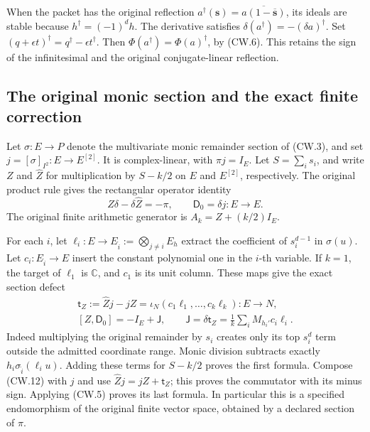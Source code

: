 When the packet has the original reflection
\(a^\dagger(\mathbf s)=\overline{a(1-\overline{\mathbf s})}\),
its ideals are stable because \(h^\dagger=(-1)^dh\).
The derivative satisfies
\(\delta(a^\dagger)=-(\delta a)^\dagger\).
Set \((q+\epsilon t)^\dagger=q^\dagger-\epsilon t^\dagger\).
Then \(\Phi(a^\dagger)=\Phi(a)^\dagger\), by (CW.6).
This retains the sign of the infinitesimal and the original
conjugate-linear reflection.

\subsection{The original monic section and the exact finite correction}

Let \(\sigma:E\to P\) denote the multivariate monic remainder
section of (CW.3), and set \(j=[\sigma]_{I^2}:E\to E^{[2]}\).
It is complex-linear, with \(\pi j=I_E\).
Let \(S=\sum_i s_i\), and write \(Z\) and \(\widehat Z\)
for multiplication by \(S-k/2\) on \(E\) and \(E^{[2]}\),
respectively.  The original product rule gives the rectangular
operator identity
\[
 Z\delta-\delta\widehat Z=-\pi,\qquad
 \mathsf D_0=\delta j:E\to E .
 \tag{CW.12}
\]
The original finite arithmetic generator is \(A_k=Z+(k/2)I_E\).

For each \(i\), let
\(\ell_i:E\to E_{\widehat i}:=\bigotimes_{j\ne i}E_h\)
extract the coefficient of \(s_i^{d-1}\) in \(\sigma(u)\).
Let \(c_i:E_{\widehat i}\to E\) insert the constant polynomial
one in the \(i\)-th variable.  If \(k=1\), the target of
\(\ell_1\) is \(\mathbb C\), and \(c_1\) is its unit column.
These maps give the exact section defect
\[
 \begin{gathered}
 \mathsf t_Z:=\widehat Zj-jZ
       =\iota_N(c_1\ell_1,\ldots,c_k\ell_k):E\to N,\\
 [Z,\mathsf D_0]=-I_E+\mathsf J,\qquad
 \mathsf J=\delta\mathsf t_Z
       =\frac1k\sum_i M_{h_i'}c_i\ell_i .
 \end{gathered}                                                    \tag{CW.13}
\]
Indeed multiplying the original remainder by \(s_i\) creates
only its top \(s_i^d\) term outside the admitted coordinate
range.  Monic division subtracts exactly
\(h_i\sigma_{\widehat i}(\ell_i u)\).
Adding these terms for \(S-k/2\) proves the first formula.
Compose (CW.12) with \(j\) and use
\(\widehat Zj=jZ+\mathsf t_Z\); this proves the commutator
with its minus sign.  Applying (CW.5) proves its last formula.
In particular this is a specified endomorphism of the original
finite vector space, obtained by a declared section of \(\pi\).

